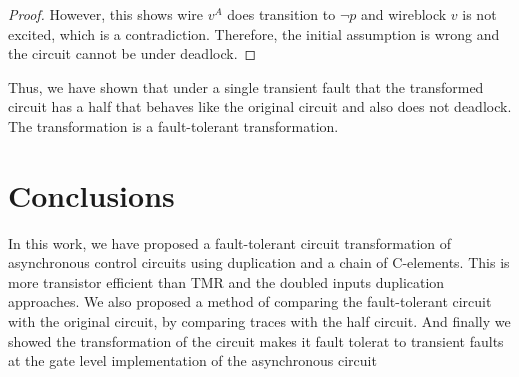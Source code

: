 \documentclass[12pt]{report}
\newtheorem*{theorem}{Theorem}
\begin{document}
\begin{proof}
However, this shows wire $v^A$ does transition to $\neg{p}$ and wireblock $v$ is not excited, which is a contradiction.  Therefore, the initial assumption is wrong and the circuit cannot be under deadlock.

\end{proof}



%
%

Thus, we have shown that under a single transient fault that the transformed circuit has a half that behaves like the original circuit and also does not deadlock.  The transformation is a fault-tolerant transformation.


\chapter{Conclusions}
In this work, we have proposed a fault-tolerant circuit transformation of asynchronous control circuits using duplication and a chain of C-elements.  This is more transistor efficient than TMR and the doubled inputs duplication approaches.  We also proposed a method of comparing the fault-tolerant circuit with the original circuit, by comparing traces with the half circuit.  And finally we showed the transformation of the circuit makes it fault tolerat to transient faults at the gate level implementation of the asynchronous circuit\\
\end{document}
